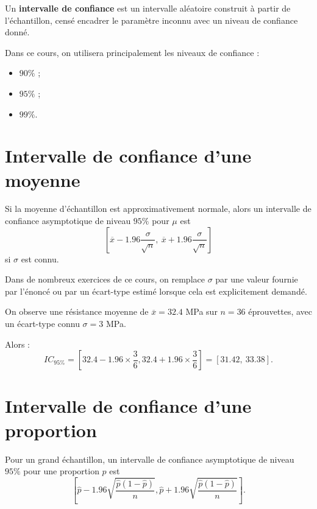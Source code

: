 \begin{Def}
Un \textbf{intervalle de confiance} est un intervalle aléatoire construit à partir de l'échantillon, censé encadrer le paramètre inconnu avec un niveau de confiance donné.
\end{Def}

\begin{Rmq}
Dans ce cours, on utilisera principalement les niveaux de confiance :
\begin{itemize}
    \item $90\%$ ;
    \item $95\%$ ;
    \item $99\%$.
\end{itemize}
\end{Rmq}

\section{Intervalle de confiance d'une moyenne}

\begin{Prop}
Si la moyenne d'échantillon est approximativement normale, alors un intervalle de confiance asymptotique de niveau $95\%$ pour $\mu$ est
$$
\left[\overline{x}-1.96\frac{\sigma}{\sqrt{n}},\ \overline{x}+1.96\frac{\sigma}{\sqrt{n}}\right]
$$
si $\sigma$ est connu.
\end{Prop}

\begin{Rmq}
Dans de nombreux exercices de ce cours, on remplace $\sigma$ par une valeur fournie par l'énoncé ou par un écart-type estimé lorsque cela est explicitement demandé.
\end{Rmq}

\begin{Ex}
On observe une résistance moyenne de $\overline{x}=32.4$ MPa sur $n=36$ éprouvettes, avec un écart-type connu $\sigma=3$ MPa.

Alors :
$$
IC_{95\%} =
\left[
32.4 - 1.96\times \frac{3}{6},
32.4 + 1.96\times \frac{3}{6}
\right]
= [31.42,\ 33.38].
$$
\end{Ex}

\section{Intervalle de confiance d'une proportion}

\begin{Prop}
Pour un grand échantillon, un intervalle de confiance asymptotique de niveau $95\%$ pour une proportion $p$ est
$$
\left[
\widehat{p} - 1.96\sqrt{\frac{\widehat{p}(1-\widehat{p})}{n}},
\widehat{p} + 1.96\sqrt{\frac{\widehat{p}(1-\widehat{p})}{n}}
\right].
$$
\end{Prop}

